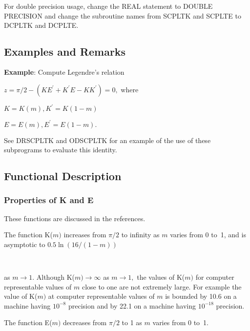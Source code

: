 \documentclass[twoside]{MATH77}
\begin{document}
For double precision usage, change the REAL statement to DOUBLE PRECISION
and change the subroutine names from SCPLTK and SCPLTE to DCPLTK and DCPLTE.

\subsection{Examples and Remarks}

{\bf Example}: Compute Legendre's relation

\hspace{.25in}$z=\pi /2 -(KE^{\prime}+K^{\prime}E-KK^{\prime}) = 0,$
\quad where

\hspace{.25in}$K=K(m),$\quad $K^{\prime}=K(1-m)$

\hspace{.25in}$E=E(m),$\quad $E^{\prime}=E(1-m).$

See DRSCPLTK and ODSCPLTK for an example of the use of these subprograms to
evaluate this identity.

\subsection{Functional Description}

\subsubsection{Properties of K and E}

These functions are discussed in the references.
\nocite{ams55:Ellip-Int}
\nocite{Hart:1968:CA:Ellip-Int}

The function K($m)$ increases from $\pi /2$ to infinity as $m$ varies from 0
to~1, and is asymptotic to $0.5 \ln (16/(1-m))$\linebreak
\vspace{10pt}

\hspace{5pt}\mbox{ }

as $m \rightarrow 1.$ Although K($m) \rightarrow \infty $ as $m \rightarrow
1,$ the values of K($m)$ for computer representable values of $m$ close
to one are not extremely large. For example the value of K($m)$ at
computer representable values of $m$ is bounded by 10.6 on a machine
having $10^{-8}$ precision and by 22.1 on a machine having $10^{-18}$
precision.

The function E($m)$ decreases from $\pi /2$ to 1 as $m$ varies from 0 to~1.
\end{document}
